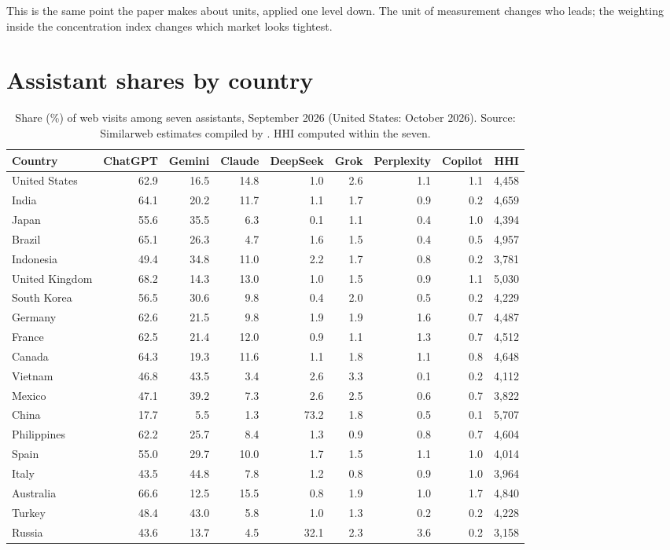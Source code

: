 \documentclass[11pt]{article}
\begin{document}
This is the same point the paper makes about units, applied one level down. The unit of measurement changes who leads; the weighting inside the concentration index changes which market looks tightest.

\section{Assistant shares by country}
\label{app:geo}

\begin{table}[H]
\centering\footnotesize
\caption{Share (\%) of web visits among seven assistants, September 2026 (United States: October 2026). Source: Similarweb estimates compiled by \cite{momentic2026chatbots}. HHI computed within the seven.}
\begin{tabular}{@{}lrrrrrrrr@{}}
\toprule
Country & ChatGPT & Gemini & Claude & DeepSeek & Grok & Perplexity & Copilot & HHI \\
\midrule
United States & 62.9 & 16.5 & 14.8 & 1.0 & 2.6 & 1.1 & 1.1 & 4{,}458 \\
India & 64.1 & 20.2 & 11.7 & 1.1 & 1.7 & 0.9 & 0.2 & 4{,}659 \\
Japan & 55.6 & 35.5 & 6.3 & 0.1 & 1.1 & 0.4 & 1.0 & 4{,}394 \\
Brazil & 65.1 & 26.3 & 4.7 & 1.6 & 1.5 & 0.4 & 0.5 & 4{,}957 \\
Indonesia & 49.4 & 34.8 & 11.0 & 2.2 & 1.7 & 0.8 & 0.2 & 3{,}781 \\
United Kingdom & 68.2 & 14.3 & 13.0 & 1.0 & 1.5 & 0.9 & 1.1 & 5{,}030 \\
South Korea & 56.5 & 30.6 & 9.8 & 0.4 & 2.0 & 0.5 & 0.2 & 4{,}229 \\
Germany & 62.6 & 21.5 & 9.8 & 1.9 & 1.9 & 1.6 & 0.7 & 4{,}487 \\
France & 62.5 & 21.4 & 12.0 & 0.9 & 1.1 & 1.3 & 0.7 & 4{,}512 \\
Canada & 64.3 & 19.3 & 11.6 & 1.1 & 1.8 & 1.1 & 0.8 & 4{,}648 \\
Vietnam & 46.8 & 43.5 & 3.4 & 2.6 & 3.3 & 0.1 & 0.2 & 4{,}112 \\
Mexico & 47.1 & 39.2 & 7.3 & 2.6 & 2.5 & 0.6 & 0.7 & 3{,}822 \\
China & 17.7 & 5.5 & 1.3 & 73.2 & 1.8 & 0.5 & 0.1 & 5{,}707 \\
Philippines & 62.2 & 25.7 & 8.4 & 1.3 & 0.9 & 0.8 & 0.7 & 4{,}604 \\
Spain & 55.0 & 29.7 & 10.0 & 1.7 & 1.5 & 1.1 & 1.0 & 4{,}014 \\
Italy & 43.5 & 44.8 & 7.8 & 1.2 & 0.8 & 0.9 & 1.0 & 3{,}964 \\
Australia & 66.6 & 12.5 & 15.5 & 0.8 & 1.9 & 1.0 & 1.7 & 4{,}840 \\
Turkey & 48.4 & 43.0 & 5.8 & 1.0 & 1.3 & 0.2 & 0.2 & 4{,}228 \\
Russia & 43.6 & 13.7 & 4.5 & 32.1 & 2.3 & 3.6 & 0.2 & 3{,}158 \\
\bottomrule
\end{tabular}
\end{table}



\end{document}
